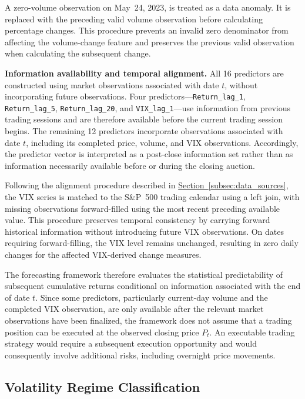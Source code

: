 \documentclass[runningheads,orivec]{llncs}
\begin{document}
A zero-volume observation on May~24, 2023, is treated as a data anomaly. It is replaced with the preceding valid volume observation before calculating percentage changes. This procedure prevents an invalid zero denominator from affecting the volume-change feature and preserves the previous valid observation when calculating the subsequent change.

\noindent\textbf{Information availability and temporal alignment.} All 16 predictors are constructed using market observations associated with date $t$, without incorporating future observations. Four predictors---\texttt{Return\_lag\_1}, \texttt{Return\_lag\_5}, \texttt{Return\_lag\_20}, and \texttt{VIX\_lag\_1}---use information from previous trading sessions and are therefore available before the current trading session begins. The remaining 12 predictors incorporate observations associated with date $t$, including its completed price, volume, and VIX observations. Accordingly, the predictor vector is interpreted as a post-close information set rather than as information necessarily available before or during the closing auction.

Following the alignment procedure described in \hyperref[subsec:data_sources]{Section~\ref*{subsec:data_sources}}, the VIX series is matched to the S\&P~500 trading calendar using a left join, with missing observations forward-filled using the most recent preceding available value. This procedure preserves temporal consistency by carrying forward historical information without introducing future VIX observations. On dates requiring forward-filling, the VIX level remains unchanged, resulting in zero daily changes for the affected VIX-derived change measures.

The forecasting framework therefore evaluates the statistical predictability of subsequent cumulative returns conditional on information associated with the end of date $t$. Since some predictors, particularly current-day volume and the completed VIX observation, are only available after the relevant market observations have been finalized, the framework does not assume that a trading position can be executed at the observed closing price $P_t$. An executable trading strategy would require a subsequent execution opportunity and would consequently involve additional risks, including overnight price movements.

\subsection{Volatility Regime Classification}\label{subsec:regime_classification}
\end{document}
